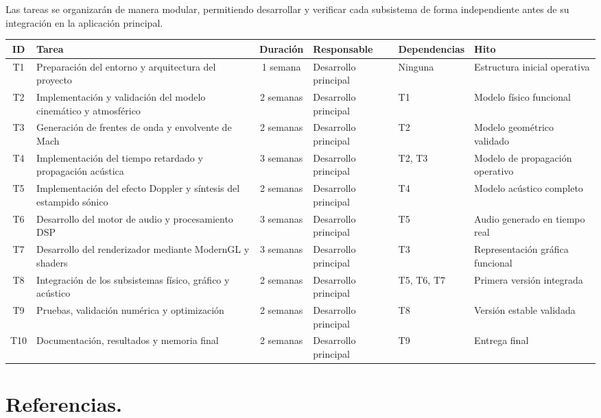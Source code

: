 \documentclass[10.5pt]{article}
\begin{document}
	Las tareas se organizarán de manera modular, permitiendo desarrollar y verificar cada subsistema de forma independiente antes de su integración en la aplicación principal.
	
	\begin{table}[H]
		\centering
		\label{tab:planificacion}
		\small
		\begin{tabular}{|c|p{3.1cm}|c|p{2.5cm}|p{2.5cm}|p{2.5cm}|}
			\hline
			\textbf{ID} & \textbf{Tarea} & \textbf{Duración} &
			\textbf{Responsable} & \textbf{Dependencias} &
			\textbf{Hito} \\
			\hline
			T1 & Preparación del entorno y arquitectura del proyecto &
			1 semana & Desarrollo principal & Ninguna &
			Estructura inicial operativa \\
			\hline
			T2 & Implementación y validación del modelo cinemático y atmosférico &
			2 semanas & Desarrollo principal & T1 &
			Modelo físico funcional \\
			\hline
			T3 & Generación de frentes de onda y envolvente de Mach &
			2 semanas & Desarrollo principal & T2 &
			Modelo geométrico validado \\
			\hline
			T4 & Implementación del tiempo retardado y propagación acústica &
			3 semanas & Desarrollo principal & T2, T3 &
			Modelo de propagación operativo \\
			\hline
			T5 & Implementación del efecto Doppler y síntesis del estampido sónico &
			2 semanas & Desarrollo principal & T4 &
			Modelo acústico completo \\
			\hline
			T6 & Desarrollo del motor de audio y procesamiento DSP &
			3 semanas & Desarrollo principal & T5 &
			Audio generado en tiempo real \\
			\hline
			T7 & Desarrollo del renderizador mediante ModernGL y shaders &
			3 semanas & Desarrollo principal & T3 &
			Representación gráfica funcional \\
			\hline
			T8 & Integración de los subsistemas físico, gráfico y acústico &
			2 semanas & Desarrollo principal & T5, T6, T7 &
			Primera versión integrada \\
			\hline
			T9 & Pruebas, validación numérica y optimización &
			2 semanas & Desarrollo principal & T8 &
			Versión estable validada \\
			\hline
			T10 & Documentación, resultados y memoria final &
			2 semanas & Desarrollo principal & T9 &
			Entrega final \\
			\hline
		\end{tabular}
	\end{table}
	
	\newpage
	
	\section{Referencias.}
	
	 
	
	
\end{document}
